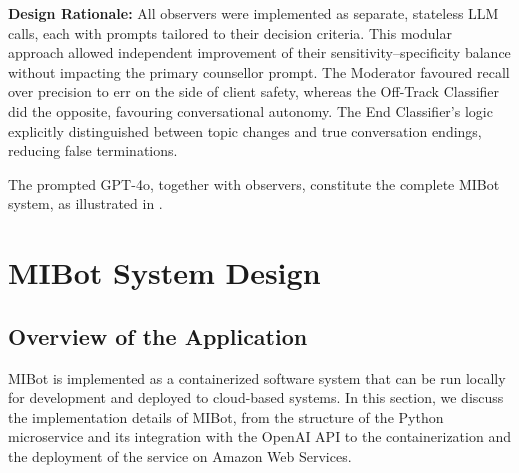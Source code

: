 \textbf{Design Rationale:} All observers were implemented as separate, stateless LLM calls, each with prompts tailored to their decision criteria. This modular approach allowed independent improvement of their sensitivity–specificity balance without impacting the primary counsellor prompt. The Moderator favoured recall over precision to err on the side of client safety, whereas the Off-Track Classifier did the opposite, favouring conversational autonomy. The End Classifier's logic explicitly distinguished between topic changes and true conversation endings, reducing false terminations.


The prompted GPT-4o, together with observers, constitute the complete MIBot system, as illustrated in .


\section{MIBot System Design}
\label{sec:deployment}


\subsection{Overview of the Application}


MIBot is implemented as a containerized software system that can be run locally for development and deployed to cloud-based systems. In this section, we discuss the implementation details of MIBot, from the structure of the Python microservice and its integration with the OpenAI API to the containerization and the deployment of the service on Amazon Web Services.

